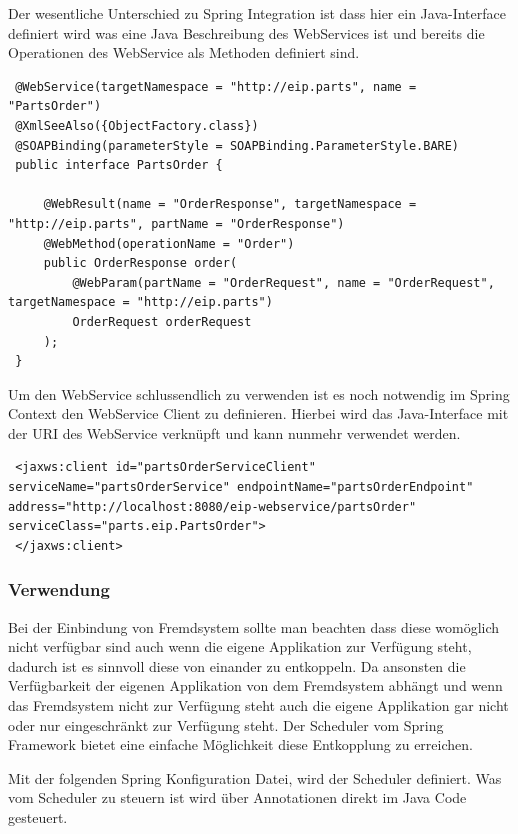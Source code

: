 \documentclass[12pt,a4paper,ngerman]{article}
\begin{document}
Der wesentliche Unterschied zu Spring Integration ist dass hier ein
Java-Interface definiert wird was eine Java Beschreibung des WebServices
ist und bereits die Operationen des WebService als Methoden definiert
sind.

\begin{lstlisting}
 @WebService(targetNamespace = "http://eip.parts", name = "PartsOrder")
 @XmlSeeAlso({ObjectFactory.class})
 @SOAPBinding(parameterStyle = SOAPBinding.ParameterStyle.BARE)
 public interface PartsOrder {

     @WebResult(name = "OrderResponse", targetNamespace = "http://eip.parts", partName = "OrderResponse")
     @WebMethod(operationName = "Order")
     public OrderResponse order(
         @WebParam(partName = "OrderRequest", name = "OrderRequest", targetNamespace = "http://eip.parts")
         OrderRequest orderRequest
     );
 }
\end{lstlisting}

Um den WebService schlussendlich zu verwenden ist es noch notwendig im
Spring Context den WebService Client zu definieren. Hierbei wird das
Java-Interface mit der URI des WebService verknüpft und kann nunmehr
verwendet werden.

\begin{lstlisting}
 <jaxws:client id="partsOrderServiceClient" serviceName="partsOrderService" endpointName="partsOrderEndpoint" address="http://localhost:8080/eip-webservice/partsOrder" serviceClass="parts.eip.PartsOrder">
 </jaxws:client>
\end{lstlisting}

\subsubsection{Verwendung}

Bei der Einbindung von Fremdsystem sollte man beachten dass diese
womöglich nicht verfügbar sind auch wenn die eigene Applikation zur
Verfügung steht, dadurch ist es sinnvoll diese von einander zu
entkoppeln. Da ansonsten die Verfügbarkeit der eigenen Applikation von
dem Fremdsystem abhängt und wenn das Fremdsystem nicht zur Verfügung
steht auch die eigene Applikation gar nicht oder nur eingeschränkt zur
Verfügung steht. Der Scheduler vom Spring Framework bietet eine einfache
Möglichkeit diese Entkopplung zu erreichen.

Mit der folgenden Spring Konfiguration Datei, wird der Scheduler
definiert. Was vom Scheduler zu steuern ist wird über Annotationen
direkt im Java Code gesteuert.
\end{document}
